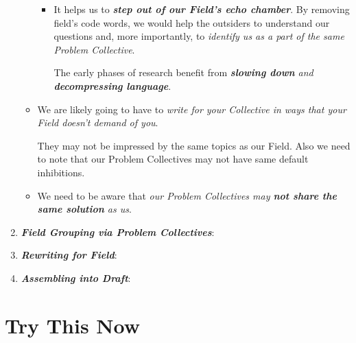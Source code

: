 \documentclass[11pt]{article}
\begin{document}
\begin{enumerate}
\begin{itemize}
\begin{itemize}
\item It helps us to \emph{\textbf{step out of our Field’s echo chamber}}. By removing field's code words, we would help the outsiders to understand our questions and, more importantly, to \emph{identify us as a part of the same Problem Collective}.  

The early phases of research benefit from \emph{\textbf{slowing down} and \textbf{decompressing language}}.
\end{itemize}

\item We are likely going to have to \emph{write for your Collective in ways that your Field doesn’t demand of you}.

They may not be impressed by the same topics as our Field. Also we need to note that our Problem Collectives may not have same default inhibitions. 

\item We need to be aware that \emph{our Problem Collectives may \textbf{not share the same solution} as us}. 
\end{itemize}

\item  \emph{\textbf{Field Grouping via Problem Collectives}}:

\item  \emph{\textbf{Rewriting for Field}}:

\item  \emph{\textbf{Assembling into Draft}}:
\end{enumerate}



\newpage
\section{Try This Now}
\end{document}

